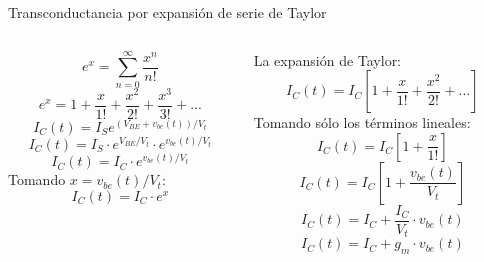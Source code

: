 \documentclass[t,aspectratio=169]{beamer}
\begin{document}
\begin{frame}{Transconductancia por expansión de serie de Taylor}

\begin{columns}
\begin{column}{0.5\textwidth}
\[ e^x = \sum_{n=0}^{\infty} \dfrac{x^n}{n!} \]
\[ e^x = 1 + \dfrac{x}{1!} + \dfrac{x^2}{2!} + \dfrac{x^3}{3!} + ... \]
\[ I_C(t) = I_S e^{(V_{BE} + v_{be}(t))/V_t} \]
\[ I_C(t) = I_S \cdot e^{V_{BE}/V_t} \cdot e^{v_{be}(t)/V_t} \]
\[ I_C(t) = I_C \cdot e^{v_{be}(t)/V_t} \]
Tomando $x = v_{be}(t)/V_t$:
\[ I_C(t) = I_C \cdot e^{x} \]

\end{column}
\begin{column}{0.5\textwidth}
La expansión de Taylor:
\[ I_C(t) = I_C \left[ 1 + \dfrac{x}{1!} + \dfrac{x^2}{2!} + ... \right] \]
Tomando sólo los términos lineales:
\[ I_C(t) = I_C \left[ 1 + \dfrac{x}{1!} \right] \]
\[ I_C(t) = I_C \left[ 1 + \dfrac{v_{be}(t)}{V_t} \right] \]
\[ I_C(t) = I_C + \dfrac{I_C}{V_t} \cdot v_{be}(t) \]
\[ I_C(t) = I_C + g_m \cdot v_{be}(t) \]
\end{column}
\end{columns}
    
\end{frame}
\end{document}
